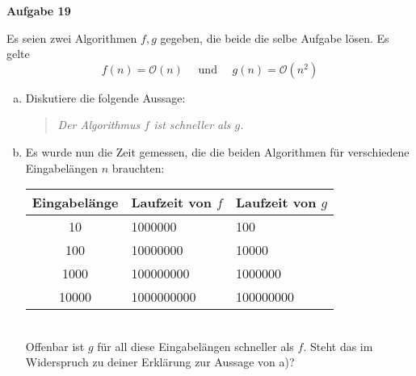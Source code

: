 \documentclass[a4paper,12pt]{article}
\newcommand{\Aufgabe}[1]{
  {
    \vspace*{0.5cm}
    \textsf{\textbf{Aufgabe #1}}
    \vspace*{0.2cm}
    
  }
}
\begin{document}
\Aufgabe{19}
Es seien zwei Algorithmen $f, g$ gegeben, die beide die selbe Aufgabe lösen. Es gelte
$$ f(n) = \mathcal{O}(n) \quad \text{ und } \quad g(n) = \mathcal{O}(n^2)  $$
\begin{enumerate}[a)]
\item Diskutiere die folgende Aussage:
  \begin{quote}
    \emph{Der Algorithmus $f$ ist schneller als $g$.}
  \end{quote}

\item Es wurde nun die Zeit gemessen, die die beiden Algorithmen für verschiedene Eingabelängen $n$ brauchten:
  \begin{table}[h!]
    \centering
    \begin{tabular}[h!]{c | l | l}
      Eingabelänge & Laufzeit von $f$ & Laufzeit von $g$ \\ \hline
      10    & 1000000    & 100  \\
      100   & 10000000   & 10000  \\
      1000  & 100000000  & 1000000  \\
      10000 & 1000000000 & 100000000  \\
    \end{tabular}
  \end{table}
  \\
  Offenbar ist $g$ für all diese Eingabelängen schneller als $f$. Steht das im Widerspruch zu deiner Erklärung zur Aussage von a)?
\end{enumerate}
\begin{quote}
  
\end{quote}
\end{document}
